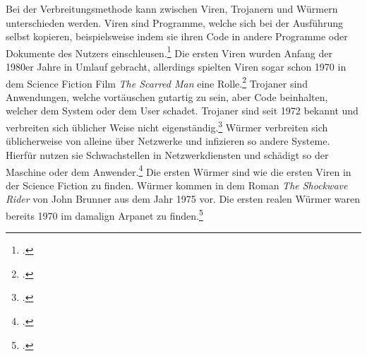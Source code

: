 Bei der Verbreitungsmethode kann zwischen Viren, Trojanern und Würmern unterschieden werden. Viren sind Programme, welche sich bei der Ausführung selbst kopieren, beispielsweise indem sie ihren Code in andere Programme oder Dokumente des Nutzers einschleusen.\footcite[Vgl.][95]{netzwerkDatensicherheit} Die ersten Viren wurden Anfang der 1980er Jahre in Umlauf gebracht, allerdings spielten Viren sogar schon 1970 in dem Science Fiction Film \textit{The Scarred Man} eine Rolle.\footcite[Vgl.][14]{virusesMalware} Trojaner sind Anwendungen, welche vortäuschen gutartig zu sein, aber Code beinhalten, welcher dem System oder dem User schadet. Trojaner sind seit 1972 bekannt und verbreiten sich üblicher Weise nicht eigenständig.\footcite[Vgl.][12\psq]{virusesMalware} Würmer verbreiten sich üblicherweise von alleine über Netzwerke und infizieren so andere Systeme. Hierfür nutzen sie Schwachstellen in Netzwerkdiensten und schädigt so der Maschine oder dem Anwender.\footcite[Vgl.][95]{netzwerkDatensicherheit} Die ersten Würmer sind wie die ersten Viren in der Science Fiction zu finden. Würmer kommen in dem Roman \textit{The Shockwave Rider} von John Brunner aus dem Jahr 1975 vor. Die ersten realen Würmer waren bereits 1970 im damalign Arpanet zu finden.\footcite[Vgl.][15]{virusesMalware}

